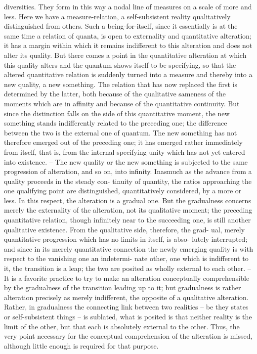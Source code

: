 diversities. They form in this way a nodal line of measures on a scale of
more and less.
Here we have a measure-relation, a self-subsistent reality qualitatively
distinguished from others. Such a being-for-itself, since it essentially is at
the same time a relation of quanta, is open to externality and quantitative
alteration; it has a margin within which it remains indifferent to this
alteration and does not alter its quality. But there comes a point in the
quantitative alteration at which this quality alters and the quantum shows
itself to be specifying, so that the altered quantitative relation is suddenly
turned into a measure and thereby into a new quality, a new something.
The relation that has now replaced the first is determined by the latter, both
because of the qualitative sameness of the moments which are in affinity and
because of the quantitative continuity. But since the distinction falls on the
side of this quantitative moment, the new something stands indifferently
related to the preceding one; the difference between the two is the external
one of quantum. The new something has not therefore emerged out of the
preceding one; it has emerged rather immediately from itself, that is, from
the internal specifying unity which has not yet entered into existence. –
The new quality or the new something is subjected to the same progression
of alteration, and so on, into infinity.
Inasmuch as the advance from a quality proceeds in the steady con-
tinuity of quantity, the ratios approaching the one qualifying point are
distinguished, quantitatively considered, by a more or less. In this respect,
the alteration is a gradual one. But the gradualness concerns merely the
externality of the alteration, not its qualitative moment; the preceding
quantitative relation, though infinitely near to the succeeding one, is still
another qualitative existence. From the qualitative side, therefore, the grad-
ual, merely quantitative progression which has no limits in itself, is abso-
lutely interrupted; and since in its merely quantitative connection the
newly emerging quality is with respect to the vanishing one an indetermi-
nate other, one which is indifferent to it, the transition is a leap; the two
are posited as wholly external to each other. – It is a favorite practice to
try to make an alteration conceptually comprehensible by the gradualness of
the transition leading up to it; but gradualness is rather alteration precisely
as merely indifferent, the opposite of a qualitative alteration. Rather, in
gradualness the connecting link between two realities – be they states or
self-subsistent things – is sublated, what is posited is that neither reality is
the limit of the other, but that each is absolutely external to the other. Thus,
the very point necessary for the conceptual comprehension of the alteration
is missed, although little enough is required for that purpose.

